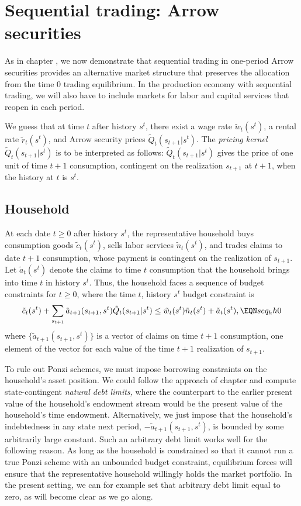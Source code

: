 \section{Sequential trading: Arrow securities}
As in chapter , we now demonstrate that sequential
trading in one-period Arrow securities provides an alternative
market structure that preserves the allocation from
the time $0$ trading equilibrium.
In the production economy with sequential trading, we
will also have to include markets for labor and capital services
that reopen in each period.


We guess that at time $t$ after history $s^t$, there exist a
wage rate $\tilde w_t(s^t)$, a rental rate $\tilde r_t(s^t)$,
and Arrow security prices $\tilde Q_t(s_{t+1} | s^t)$.
The {\it pricing kernel} $\tilde Q_t(s_{t+1} | s^t)$ is to be
interpreted as follows:
$\tilde Q_t(s_{t+1} | s^t)$ gives the price of one unit of
time $t+1$ consumption,
contingent on the realization $s_{t+1}$ at $t+1$, when the
history at $t$ is $s^t$.


\subsection{Household}
At each date $t \geq 0$ after history $s^t$,
the representative household buys consumption
goods $\tilde c_t(s^t)$, sells labor services $\tilde n_t(s^t)$, and
trades claims to date $t+1$ consumption,
whose payment is  contingent
on the realization of $s_{t+1}$.   Let $\tilde a_t(s^t)$ denote the
claims to time $t$ consumption
that the household brings into time $t$ in history $s^t$. Thus,
the household faces a sequence of budget constraints
for $t \geq 0$, where the time $t$, history $s^t$ budget constraint is
$$ \tilde c_t(s^t) + \sum_{s_{t+1}} \tilde a_{t+1}(s_{t+1},s^t)
\tilde Q_t(s_{t+1} | s^t)
     \leq  \tilde w_t(s^t) \tilde n_t(s^t) + \tilde a_t(s^t) , \EQN seq_hh0   $$
 where
$\{\tilde a_{t+1}(s_{t+1},s^t)\}$  is a vector of claims on
time $t+1$ consumption,
one element of the vector for each  value of the time $t+1$ realization of
$s_{t+1}$.


To rule out Ponzi schemes, we must impose borrowing constraints on
the household's asset position. We could follow the approach of
chapter  and compute state-contingent
{\it natural debt limits,\/} where the counterpart to the earlier present
value of the household's endowment stream would be the present
value of the household's time endowment. Alternatively, we  just
impose that the household's indebtedness in any state
next period, $-\tilde a_{t+1}(s_{t+1},s^t)$, is bounded by some
arbitrarily large constant. Such an arbitrary debt limit works
well for the following reason. As long as the household is constrained
so that it cannot run a true Ponzi scheme with an unbounded budget
constraint, equilibrium forces will ensure that the representative
household willingly holds the market portfolio. In the present setting, we
can for example set that arbitrary debt limit equal to zero, as will
become clear as we go along.


